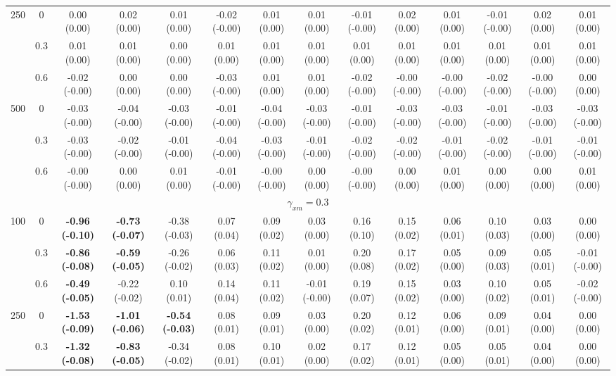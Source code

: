 \documentclass[
  man,mask]{apa6}
\newenvironment{lltable}{\begin{landscape}\centering\begin{ThreePartTable}}{\end{ThreePartTable}\end{landscape}}
\begin{document}
\begin{lltable}
{\begin{longtable}{cccccccccccccc}
250 & 0 & 0.00 (0.00) & 0.02 (0.00) & 0.01 (0.00) & -0.02 (-0.00) & 0.01 (0.00) & 0.01 (0.00) & -0.01 (-0.00) & 0.02 (0.00) & 0.01 (0.00) & -0.01 (-0.00) & 0.02 (0.00) & 0.01 (0.00)\\
 & 0.3 & 0.01 (0.00) & 0.01 (0.00) & 0.00 (0.00) & 0.01 (0.00) & 0.01 (0.00) & 0.01 (0.00) & 0.01 (0.00) & 0.01 (0.00) & 0.01 (0.00) & 0.01 (0.00) & 0.01 (0.00) & 0.01 (0.00)\\
 & 0.6 & -0.02 (-0.00) & 0.00 (0.00) & 0.00 (0.00) & -0.03 (-0.00) & 0.01 (0.00) & 0.01 (0.00) & -0.02 (-0.00) & -0.00 (-0.00) & -0.00 (-0.00) & -0.02 (-0.00) & -0.00 (-0.00) & 0.00 (0.00)\\
500 & 0 & -0.03 (-0.00) & -0.04 (-0.00) & -0.03 (-0.00) & -0.01 (-0.00) & -0.04 (-0.00) & -0.03 (-0.00) & -0.01 (-0.00) & -0.03 (-0.00) & -0.03 (-0.00) & -0.01 (-0.00) & -0.03 (-0.00) & -0.03 (-0.00)\\
 & 0.3 & -0.03 (-0.00) & -0.02 (-0.00) & -0.01 (-0.00) & -0.04 (-0.00) & -0.03 (-0.00) & -0.01 (-0.00) & -0.02 (-0.00) & -0.02 (-0.00) & -0.01 (-0.00) & -0.02 (-0.00) & -0.01 (-0.00) & -0.01 (-0.00)\\
 & 0.6 & -0.00 (-0.00) & 0.00 (0.00) & 0.01 (0.00) & -0.01 (-0.00) & -0.00 (-0.00) & 0.00 (0.00) & -0.00 (-0.00) & 0.00 (0.00) & 0.01 (0.00) & 0.00 (0.00) & 0.00 (0.00) & 0.01 (0.00)\\
\multicolumn{14}{c}{$\gamma_{xm} = 0.3$}\\
100 & 0 & \textbf{-0.96 (-0.10)} & \textbf{-0.73 (-0.07)} & -0.38 (-0.03) & 0.07 (0.04) & 0.09 (0.02) & 0.03 (0.00) & 0.16 (0.10) & 0.15 (0.02) & 0.06 (0.01) & 0.10 (0.03) & 0.03 (0.00) & 0.00 (0.00)\\
 & 0.3 & \textbf{-0.86 (-0.08)} & \textbf{-0.59 (-0.05)} & -0.26 (-0.02) & 0.06 (0.03) & 0.11 (0.02) & 0.01 (0.00) & 0.20 (0.08) & 0.17 (0.02) & 0.05 (0.00) & 0.09 (0.03) & 0.05 (0.01) & -0.01 (-0.00)\\
 & 0.6 & \textbf{-0.49 (-0.05)} & -0.22 (-0.02) & 0.10 (0.01) & 0.14 (0.04) & 0.11 (0.02) & -0.01 (-0.00) & 0.19 (0.07) & 0.15 (0.02) & 0.03 (0.00) & 0.10 (0.02) & 0.05 (0.01) & -0.02 (-0.00)\\
250 & 0 & \textbf{-1.53 (-0.09)} & \textbf{-1.01 (-0.06)} & \textbf{-0.54 (-0.03)} & 0.08 (0.01) & 0.09 (0.01) & 0.03 (0.00) & 0.20 (0.02) & 0.12 (0.01) & 0.06 (0.00) & 0.09 (0.01) & 0.04 (0.00) & 0.00 (0.00)\\
 & 0.3 & \textbf{-1.32 (-0.08)} & \textbf{-0.83 (-0.05)} & -0.34 (-0.02) & 0.08 (0.01) & 0.10 (0.01) & 0.02 (0.00) & 0.17 (0.02) & 0.12 (0.01) & 0.05 (0.00) & 0.05 (0.01) & 0.04 (0.00) & 0.00 (0.00)\\

\end{longtable}}
\end{lltable}
\end{document}
